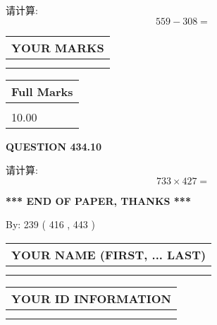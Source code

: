 \documentclass{ctexart}
\begin{document}
  
 
请计算:
\begin{equation}
559 -   %
308 = \nonumber
\end{equation}
 

 

 
  
\vspace{0.2in}
  
\noindent\begin{tabular}{|l|}
\hline
 YOUR MARKS  \\
\hline
 \\ 
 \\ 
\hline
\end{tabular}
\hspace{0.05in} \begin{tabular}{|l|}
\hline
 Full Marks  \\
\hline
 \\ 
10.00 \\
\hline
\end{tabular}
{\textbf{\Large{QUESTION
434.10 
}}}
  
  
 
请计算:
\begin{equation}
733  \times    %
427 = \nonumber
\end{equation}
 

 

 
   
   
 \vspace{0.2in}
 
   
   
   
   
\vspace{1.0in} 
{\textbf{\large{ *** END OF PAPER, THANKS *** }}} 
   
   
\hspace{1.0in} By: 
 239 ( 416 ,  443 )
   
   
   
   
\newpage 
\setcounter{page}{ 
   435001 } 
   
   
   
   
\noindent\begin{tabular}{|l|}
\hline
YOUR NAME (FIRST, ... LAST)  \\
\hline
 \\ 
 \\ 
\hline
\end{tabular}
\hspace{0.05in} \begin{tabular}{|l|}
\hline
 YOUR   ID   INFORMATION  \\
\hline
 \\ 
 \\ 
\hline
\end{tabular}
   
\end{document}
